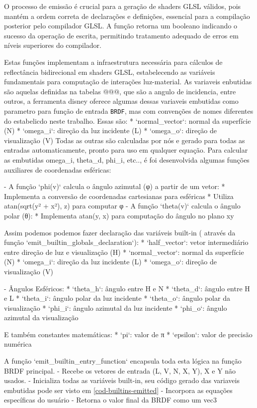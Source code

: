 O processo de emissão é crucial para a geração de shaders GLSL válidos, pois mantém a ordem correta de declarações e definições, essencial para a compilação posterior pelo compilador GLSL. A função retorna um booleano indicando o sucesso da operação de escrita, permitindo tratamento adequado de erros em níveis superiores do compilador.

Estas funções implementam a infraestrutura necessária para cálculos de reflectância bidirecional em shaders GLSL, estabelecendo as variáveis fundamentais para computação de interações luz-material. As variaveis enbutidas são aquelas definidas na tabelas @@@, que são a angulo de incidencia, entre outros, a ferramenta disney oferece algumas dessas variaveis embutidas como parametro para função de entrada \verb`BRDF`, mas com convenções de nomes diferentes do estabelicdo neste trabalho. Essas são:
     * `normal_vector`: normal da superfície (N)
     * `omega_i`: direção da luz incidente (L)
     * `omega_o`: direção de visualização (V)
Todas as outras são calculadas por nós e gerado para todas as entradas automaticamente, pronto para uso em qualquer equação. 
Para calcular as embutidas omega_i, theta_d, phi_i, etc.., é foi desenvolvida algumas funções auxiliares de coordenadas esféricas: 

   - A função `phi(v)` calcula o ângulo azimutal (φ) a partir de um vetor:
     * Implementa a conversão de coordenadas cartesianas para esféricas
     * Utiliza atan(sqrt(y² + x²), z) para computar φ
   - A função `theta(v)` calcula o ângulo polar (θ):
     * Implementa atan(y, x) para computação do ângulo no plano xy

Assim podemos podemos fazer declaração das variáveis built-in  ( através da função `emit_builtin_globals_declaration`):
     * `half_vector`: vetor intermediário entre direção de luz e visualização (H)
     * `normal_vector`: normal da superfície (N)
     * `omega_i`: direção da luz incidente (L)
     * `omega_o`: direção de visualização (V)
   
   - Ângulos Esféricos:
     * `theta_h`: ângulo entre H e N
     * `theta_d`: ângulo entre H e L
     * `theta_i`: ângulo polar da luz incidente
     * `theta_o`: ângulo polar da visualização
     * `phi_i`: ângulo azimutal da luz incidente
     * `phi_o`: ângulo azimutal da visualização

E também constantes matemáticas:
     * `pi`: valor de π
     * `epsilon`: valor de precisão numérica


A função `emit_builtin_entry_function` encapsula toda esta lógica na função BRDF principal. 
- Recebe os vetores de entrada (L, V, N, X, Y), X e Y não usados.
- Inicializa todas as variáveis built-in, seu código gerado das variaveis embutidas pode ser visto em \autoref{cod-builtins-emitted}
- Incorpora as equações específicas do usuário
- Retorna o valor final da BRDF como um vec3

